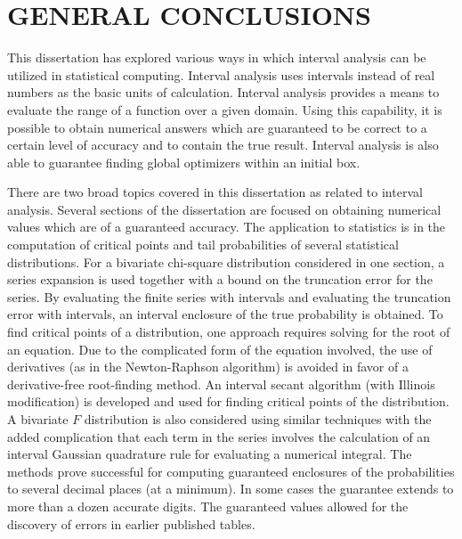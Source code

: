 %

\chapter{GENERAL CONCLUSIONS}


This dissertation has explored various ways in which interval analysis can be
utilized in statistical computing.  Interval analysis uses intervals instead
of real numbers as the basic units of calculation.  Interval analysis provides
a means to evaluate the range of a function over a given domain.  Using this
capability, it is possible to obtain numerical answers which are guaranteed to
be correct to a certain level of accuracy and to contain the true result.
Interval analysis is also able to guarantee finding global optimizers within
an initial box.

There are two broad topics covered in this dissertation as related to interval
analysis.  Several sections of the dissertation are focused on obtaining
numerical values which are of a guaranteed accuracy.  The application to
statistics is in the computation of critical points and tail probabilities of
several statistical distributions. For a bivariate chi-square distribution
considered in one section, a series expansion is used together with a bound on
the truncation error for the series.  By evaluating the finite series with
intervals and evaluating the truncation error with intervals, an interval
enclosure of the true probability is obtained.  To find critical points of a
distribution, one approach requires solving for the root of an equation.  Due
to the complicated form of the equation involved, the use of derivatives (as
in the Newton-Raphson algorithm) is avoided in favor of a derivative-free
root-finding method.  An interval secant algorithm (with Illinois
modification) is developed and used for finding critical points of the
distribution.  A bivariate $F$ distribution is also considered using similar
techniques with the added complication that each term in the series involves
the calculation of an interval Gaussian quadrature rule for evaluating a
numerical integral.  The methods prove successful for computing guaranteed
enclosures of the probabilities to several decimal places (at a minimum).  In
some cases the guarantee extends to more than a dozen accurate digits.  The
guaranteed values allowed for the discovery of errors in earlier published
tables.


